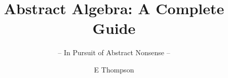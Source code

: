 \documentclass[graybox,envcountchap,sectrefs]{style/svmono}
\begin{document}
\author{E Thompson}
\title{Abstract Algebra: A Complete Guide}
\subtitle{-- In Pursuit of Abstract Nonsense --}
\maketitle

\frontmatter%

%
%

%

\tableofcontents

%


\mainmatter%




































\backmatter%
%
%
%
\printindex

\end{document}
